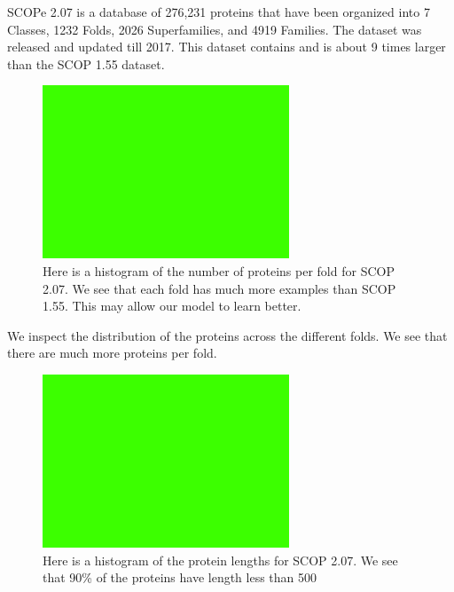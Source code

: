 \documentclass[12pt, a4paper, twocolumn, fullpage]{article}
\theoremstyle{plain}
\theoremstyle{definition}
\theoremstyle{remark}
\begin{document}
SCOPe 2.07 is a database of 276,231 proteins that have been organized into 7 Classes, 1232 Folds, 2026 Superfamilies, and 4919 Families. The dataset was released and updated till 2017. This dataset contains and is about 9 times larger than the SCOP 1.55 dataset.

\begin{figure}
    \includegraphics[width=\linewidth]{img/blank.png}
    \caption{Here is a histogram of the number of proteins per fold for SCOP 2.07. We see that each fold has much more examples than SCOP 1.55. This may allow our model to learn better.}
    \label{numproteinfold2.07}
\end{figure}

We inspect the distribution of the proteins across the different folds. We see that there are much more proteins per fold.

\begin{figure}
    \includegraphics[width=\linewidth]{img/blank.png}
    \caption{Here is a histogram of the protein lengths for SCOP 2.07. We see that 90\% of the proteins have length less than 500}
    \label{chainlength2.07}
\end{figure}
\end{document}
